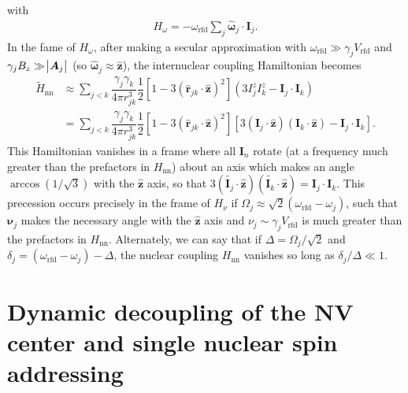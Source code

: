 \documentclass[11pt]{article}
\renewcommand{\t}{\text} %
\newcommand{\f}[2]{\dfrac{#1}{#2}} %
\newcommand{\p}[1]{\left(#1\right)} %
\renewcommand{\sp}[1]{\left[#1\right]} %
\renewcommand{\v}{\bm} %
\newcommand{\uv}[1]{\hat{\v{#1}}} %
\renewcommand{\c}{\cdot} %
\begin{document}
with
\begin{align}
  H_\omega=-\omega_{\t{rfd}}\sum_j\uv\omega_j\c\v I_j.
\end{align}
In the fame of $H_\omega$, after making a secular approximation with
$\omega_{\t{rfd}}\gg\gamma_jV_{\t{rfd}}$ and $\gamma_jB_z\gg\abs{\v
  A_j}$ (so $\uv\omega_j\approx\uv z$), the internuclear coupling
Hamiltonian becomes
\begin{align}
  \tilde H_{\t{nn}}&\approx\sum_{j<k}\f{\gamma_j\gamma_k}{4\pi
    r_{jk}^3}
  \f12\sp{1-3\p{\uv r_{jk}\c\uv z}^2}\p{3I_j^zI_k^z-\v I_j\c\v I_k} \\
  &=\sum_{j<k}\f{\gamma_j\gamma_k}{4\pi r_{jk}^3} \f12\sp{1-3\p{\uv
      r_{jk}\c\uv z}^2} \sp{3\p{\v I_j\c\uv z}\p{\v I_k\c\uv z}-\v
    I_j\c\v I_k}.
\end{align}
This Hamiltonian vanishes in a frame where all $\v I_n$ rotate (at a
frequency much greater than the prefactors in $H_{\t{nn}}$) about an
axis which makes an angle $\arccos\p{1/\sqrt3}$ with the $\uv z$ axis,
so that $3\p{\tilde{\v I_j}\c\uv z}\p{\tilde{\v I_k}\c\uv z}=\v
I_j\c\v I_k$. This precession occurs precisely in the frame of $H_\nu$
if $\Omega_j\approx\sqrt2\p{\omega_{\t{rfd}}-\omega_j}$, such that
$\v\nu_j$ makes the necessary angle with the $\uv z$ axis and
$\nu_j\sim\gamma_jV_{\t{rfd}}$ is much greater than the prefactors in
$H_{\t{nn}}$. Alternately, we can say that if $\Delta=\Omega_j/\sqrt2$
and $\delta_j=\p{\omega_{\t{rfd}}-\omega_j}-\Delta$, the nuclear
coupling $H_{\t{nn}}$ vanishes so long as $\delta_j/\Delta\ll 1$.

\newpage
\section*{Dynamic decoupling of the NV center and single nuclear spin
  addressing}
\end{document}
